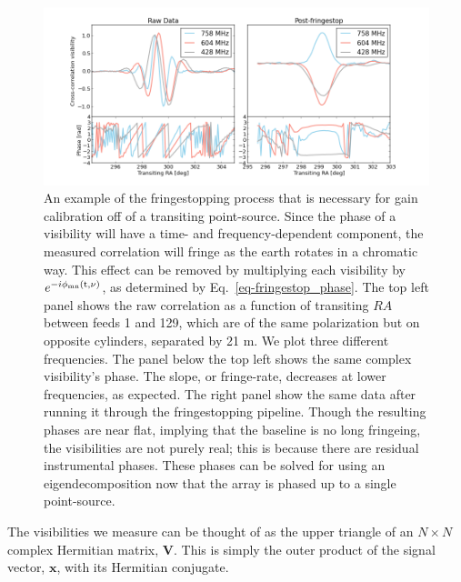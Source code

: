 \begin{figure}[!h]
\label{fig-fringestop}
\begin{center}
\vspace{1cm}
\includegraphics[trim={1in 0in 1in 1in}, width=\smwidth]{./figures/beamforming/thesis_fringestop.png}
\caption[abc]{An example of the fringestopping process that is 
 necessary for gain calibration off of a transiting point-source. Since 
 the phase of a visibility will have a time- and frequency-dependent 
 component, the measured correlation will fringe as the earth rotates in 
 a chromatic way. This effect can be removed by multiplying each visibility by 
 $e^{-i \phi_{\rm mn}(\rm t, \nu)}$, as determined by Eq.~\ref{eq-fringestop_phase}. 
 The top left panel shows the raw correlation as a function of transiting
 $RA$ between feeds 1 and 129, which are of the same polarization but 
 on opposite cylinders, separated by 21 m. We plot  
 three different frequencies. The panel below the top left
 shows the same complex visibility's phase. The slope, or fringe-rate, decreases 
 at lower frequencies, as expected. The right panel show the same data 
 after running it through the fringestopping pipeline. Though the resulting 
 phases are near flat, implying that the baseline is no long fringeing, 
 the visibilities are not purely real; this is because there are residual 
 instrumental phases. These phases can be solved for using an 
 eigendecomposition now that the array is phased up to a single point-source.}  
\end{center}
\end{figure}



The visibilities we measure can be thought of as 
the upper triangle of an $N\times N$ complex Hermitian 
matrix, $\mathbf{V}$. This is simply the outer product of the 
signal vector, $\mathbf{x}$, with its Hermitian conjugate. 

